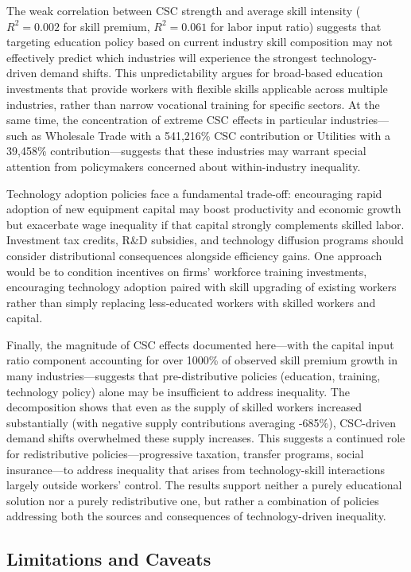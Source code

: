 \documentclass[12pt]{article}
\begin{document}
The weak correlation between CSC strength and average skill intensity ($R^2 = 0.002$ for skill premium, $R^2 = 0.061$ for labor input ratio) suggests that targeting education policy based on current industry skill composition may not effectively predict which industries will experience the strongest technology-driven demand shifts. This unpredictability argues for broad-based education investments that provide workers with flexible skills applicable across multiple industries, rather than narrow vocational training for specific sectors. At the same time, the concentration of extreme CSC effects in particular industries---such as Wholesale Trade with a 541,216\% CSC contribution or Utilities with a 39,458\% contribution---suggests that these industries may warrant special attention from policymakers concerned about within-industry inequality.

Technology adoption policies face a fundamental trade-off: encouraging rapid adoption of new equipment capital may boost productivity and economic growth but exacerbate wage inequality if that capital strongly complements skilled labor. Investment tax credits, R\&D subsidies, and technology diffusion programs should consider distributional consequences alongside efficiency gains. One approach would be to condition incentives on firms' workforce training investments, encouraging technology adoption paired with skill upgrading of existing workers rather than simply replacing less-educated workers with skilled workers and capital.

Finally, the magnitude of CSC effects documented here---with the capital input ratio component accounting for over 1000\% of observed skill premium growth in many industries---suggests that pre-distributive policies (education, training, technology policy) alone may be insufficient to address inequality. The decomposition shows that even as the supply of skilled workers increased substantially (with negative supply contributions averaging -685\%), CSC-driven demand shifts overwhelmed these supply increases. This suggests a continued role for redistributive policies---progressive taxation, transfer programs, social insurance---to address inequality that arises from technology-skill interactions largely outside workers' control. The results support neither a purely educational solution nor a purely redistributive one, but rather a combination of policies addressing both the sources and consequences of technology-driven inequality.

\subsection{Limitations and Caveats}\label{sec:limitations}
\end{document}
